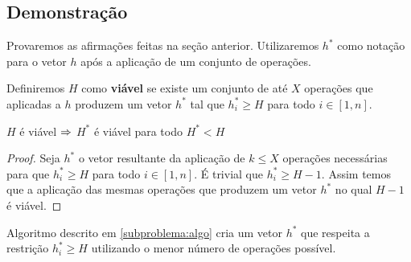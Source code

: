 \subsection*{Demonstração}

Provaremos as afirmações feitas na seção anterior. Utilizaremos $h^*$ como notação para o vetor $h$ após a aplicação de um conjunto de operações.

Definiremos $H$ como \textbf{viável} se existe um conjunto de até $X$ operações que aplicadas a $h$ produzem um vetor $h^*$ tal que $h^*_i \geq H$ para todo $i \in [1, n]$.

\begin{prop}
    $H$ é viável $\Rightarrow$ $H^*$ é viável para todo $H^* < H$
\end{prop}

\begin{proof}
    Seja $h^*$ o vetor resultante da aplicação de $k \leq X$ operações necessárias para que $h^*_i \geq H$ para todo $i \in [1, n]$. É trivial que $h^*_i \geq H - 1$. Assim temos que a aplicação das mesmas operações que produzem um vetor $h^*$ no qual $H - 1$ é viável.
\end{proof}

\begin{prop}
    Algoritmo descrito em \ref{subproblema:algo} cria um vetor $h^*$ que respeita a restrição $h^*_i \geq H$ utilizando o menor número de operações possível.
\end{prop}


